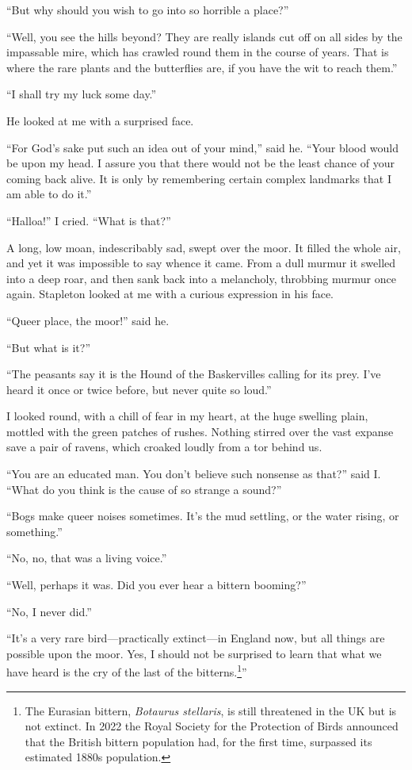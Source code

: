 \documentclass[paper=5.5in:8.5in,BCOR=7mm,twoside,DIV=calc,12pt,usegeometry,openany,chapterprefix,endperiod,headings=big]{scrbook} %
\begin{document}
\afterpage{\clearpage}

\enquote{But why should you wish to go into so horrible a place?}

\enquote{Well, you see the hills beyond? They are really islands cut off on all sides by the impassable mire, which has crawled round them in the course of years. That is where the rare plants and the butterflies are, if you have the wit to reach them.}

\enquote{I shall try my luck some day.}

He looked at me with a surprised face.

\enquote{For God's sake put such an idea out of your mind,} said he. \enquote{Your blood would be upon my head. I assure you that there would not be the least chance of your coming back alive. It is only by remembering certain complex landmarks that I am able to do it.}

\enquote{Halloa!} I cried. \enquote{What is that?}

A long, low moan, indescribably sad, swept over the moor. It filled the whole air, and yet it was impossible to say whence it came. From a dull murmur it swelled into a deep roar, and then sank back into a melancholy, throbbing murmur once again. Stapleton looked at me with a curious expression in his face.

\enquote{Queer place, the moor!} said he.

\enquote{But what is it?}

\enquote{The peasants say it is the Hound of the Baskervilles calling for its prey. I've heard it once or twice before, but never quite so loud.}

I looked round, with a chill of fear in my heart, at the huge swelling plain, mottled with the green patches of rushes. Nothing stirred over the vast expanse save a pair of ravens, which croaked loudly from a tor behind us.

\enquote{You are an educated man. You don't believe such nonsense as that?} said I. \enquote{What do you think is the cause of so strange a sound?}

\enquote{Bogs make queer noises sometimes. It's the mud settling, or the water rising, or something.}

\enquote{No, no, that was a living voice.}

\enquote{Well, perhaps it was. Did you ever hear a bittern booming?}

\enquote{No, I never did.}

\enquote{It's a very rare bird---practically extinct---in England now, but all things are possible upon the moor. Yes, I should not be surprised to learn that what we have heard is the cry of the last of the bitterns.\footnote{The Eurasian bittern, \textit{Botaurus stellaris}, is still threatened in the UK but is not extinct. In 2022 the Royal Society for the Protection of Birds announced that the British bittern population had, for the first time, surpassed its estimated 1880s population.}}
\end{document}
